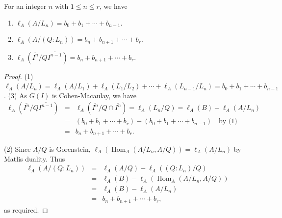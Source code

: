 \documentclass[10pt,a4paper]{amsart}
\DeclareMathOperator{\Hom}{Hom}
\begin{document}
\begin{lem} \label{sum-B}
For an integer $n$ 
with $1 \le n \le r$, we have 
\begin{enumerate}
\item $\ell_A(A/L_n)=b_0+b_1+\cdots+b_{n-1}$. 
\item $\ell_A(A/(Q:L_n))=b_n+b_{n+1}+\cdots + b_r$. 
\item $\ell_A(\overline{I^n}/Q\overline{I^{n-1}})=b_n+b_{n+1}+\cdots+b_r$. 
\end{enumerate}
\end{lem}

\begin{proof}
(1) $\ell_A(A/L_n)=\ell_A(A/L_1)+\ell_A(L_1/L_2)+\cdots +\ell_A(L_{n-1}/L_n)=b_0+b_1+\cdots+b_{n-1}$. 
\vspace{3mm}
(3) As $\overline{G}(I)$ is Cohen-Macaulay, we have 
\begin{eqnarray*}
\ell_A(\overline{I^n}/Q\overline{I^{n-1}}) 
& = & \ell_A(\overline{I^n}/Q \cap \overline{I^{n}}) 
 = \ell_A(L_n/Q) 
 =  \ell_A(B)-\ell_A(A/L_n) \\
& = & (b_0+b_1+\cdots+b_r)-(b_0+b_1+\cdots+b_{n-1}) \quad \text{by (1)}\\
& = & b_n+b_{n+1}+\cdots + b_r. 
\end{eqnarray*}
\par 
(2) Since $A/Q$ is Gorenstein, 
$\ell_A(\Hom_A(A/L_n, A/Q))=\ell_A(A/L_n)$ by Matlis duality. 
Thus 
\begin{eqnarray*}
\ell_A(A/(Q:L_n))
&=&\ell_A(A/Q)-\ell_A((Q:L_n)/Q) \\ 
&=&\ell_A(B)-\ell_A(\Hom_A(A/L_n, A/Q)) \\
&=&\ell_A(B)-\ell_A(A/L_n) \\
&=& b_n+b_{n+1}+\cdots +b_r, 
\end{eqnarray*}
as required.  
\end{proof}
\end{document}

